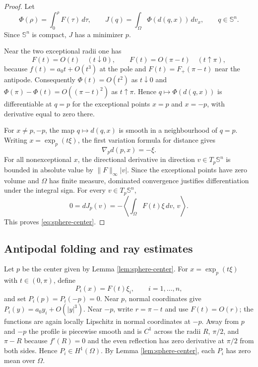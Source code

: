 \documentclass[11pt]{amsart}
\theoremstyle{remark}
\newcommand{\Sn}{\mathbb S}
\begin{document}
\begin{proof}
Let
$$
        \Phi(\rho)=\int_0^\rho F(\tau)\,d\tau,
        \qquad
        J(q)=\int_\Omega \Phi(d(q,x))\,dv_x,
        \qquad q\in\Sn^n.
$$
Since $\Sn^n$ is compact, $J$ has a minimizer $p$.

Near the two exceptional radii one has
$$
        F(t)=O(t)\quad (t\downarrow0),
        \qquad
        F(t)=O(\pi-t)\quad (t\uparrow\pi),
$$
because $f(t)=a_0t+O(t^3)$ at the pole and $F(t)=F_+(\pi-t)$ near the antipode.  Consequently $\Phi(t)=O(t^2)$ as $t\downarrow0$ and $\Phi(\pi)-\Phi(t)=O((\pi-t)^2)$ as $t\uparrow\pi$.  Hence $q\mapsto\Phi(d(q,x))$ is differentiable at $q=p$ for the exceptional points $x=p$ and $x=-p$, with derivative equal to zero there.

For $x\ne p,-p$, the map $q\mapsto d(q,x)$ is smooth in a neighbourhood of $q=p$.  Writing $x=\exp_p(t\xi)$, the first variation formula for distance gives
$$
        \nabla_p d(p,x)=-\xi.
$$
For all nonexceptional $x$, the directional derivative in direction $v\in T_p\Sn^n$ is bounded in absolute value by $\|F\|_\infty |v|$.  Since the exceptional points have zero volume and $\Omega$ has finite measure, dominated convergence justifies differentiation under the integral sign.  For every $v\in T_p\Sn^n$,
$$
        0=dJ_p(v)=-\left\langle \int_\Omega F(t)\xi\,dv,\,v\right\rangle.
$$
This proves \eqref{eq:sphere-center}.
\end{proof}

\subsection{Antipodal folding and ray estimates}

Let $p$ be the center given by Lemma \ref{lem:sphere-center}.  For $x=\exp_p(t\xi)$ with $t\in(0,\pi)$, define
\begin{equation}\label{eq:sphere-P-def}
        P_i(x)=F(t)\xi_i,
        \qquad i=1,\dots,n,
\end{equation}
and set $P_i(p)=P_i(-p)=0$.  Near $p$, normal coordinates give $P_i(y)=a_0y_i+O(|y|^3)$.  Near $-p$, write $r=\pi-t$ and use $F(t)=O(r)$; the functions are again locally Lipschitz in normal coordinates at $-p$.  Away from $p$ and $-p$ the profile is piecewise smooth and is $C^1$ across the radii $R$, $\pi/2$, and $\pi-R$ because $f'(R)=0$ and the even reflection has zero derivative at $\pi/2$ from both sides.  Hence $P_i\in H^1(\Omega)$.  By Lemma \ref{lem:sphere-center}, each $P_i$ has zero mean over $\Omega$.
\end{document}
